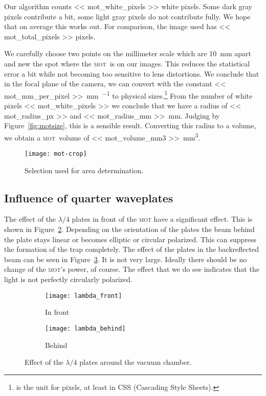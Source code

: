 \documentclass[11pt, english, fleqn, DIV=15, headinclude, BCOR=2cm]{scrreprt}
\newcommand\mot{\textsc{mot}}
\begin{document}
Our algorithm counts \num{<< mot_white_pixels >>} white pixels. Some dark gray
pixels contribute a bit, some light gray pixels do not contribute fully. We
hope that on average this works out. For comparison, the image used has \num{<<
mot_total_pixels >>} pixels.

We carefully choose two points on the millimeter scale which are
\SI{10}{\milli\meter} apart and new the spot where the \mot\ is on our images.
This reduces the statistical error a bit while not becoming too sensitive to
lens distortions. We conclude that in the focal plane of the camera, we can
convert with the constant \SI{<< mot_mm_per_pixel >>}{\milli\meter\per\pixel}
to physical sizes.\footnote{\si{\pixel} is the unit for pixels, at least in CSS
(Cascading Style Sheets).} From the number of white pixels \num{<<
mot_white_pixels >>} we conclude that we have a radius of \SI{<< mot_radius_px
>>}{\pixel} and \SI{<< mot_radius_mm >>}{\milli\meter}. Judging by
Figure~\ref{fig:motsize}, this is a sensible result. Converting this radius to
a volume, we obtain a \mot\ volume of \SI{<< mot_volume_mm3
>>}{\milli\meter\cubed}.


\begin{figure}
    \centering
    \texttt{[image: mot-crop]}
    \caption{%
        Selection used for area determination.
    }
    \label{fig:mot-crop}
\end{figure}

\subsection{Influence of quarter waveplates}

The effect of the $\lambda/4$ plates in front of the \mot{} have a significant
effect. This is shown in Figure~\ref{fig:lambda_front}. Depending on the
orientation of the plates the beam behind the plate stays linear or becomes
elliptic or circular polarized. This can suppress the formation of the
trap completely. The effect of the plates in the
backreflected beam can be seen in Figure~\ref{fig:lambda_behind}. It is not very
large. Ideally there should be no change of the \mot's power, of course. The
effect that we do see indicates that the light is not perfectly circularly
polarized.

\begin{figure}
    \centering
    \begin{subfigure}[c]{0.48\linewidth}
    \centering
    \texttt{[image: lambda\_front]}
    \caption{%
        In front
    }
    \label{fig:lambda_front}
    \end{subfigure}
    \hfill
    \begin{subfigure}[c]{0.48\linewidth}
    \centering
    \texttt{[image: lambda\_behind]}
    \caption{%
        Behind
    }
    \label{fig:lambda_behind}
    \end{subfigure}
    \caption{%
        Effect of the $\lambda/4$ plates around the vacuum chamber.
    }
    \label{fig:}
\end{figure}
\end{document}
